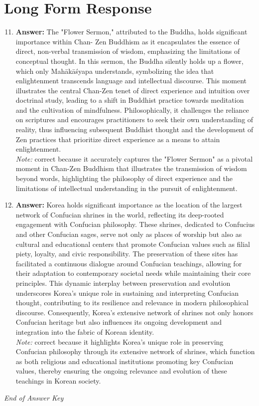\documentclass[12pt]{article}
\begin{document}
\section*{Long Form Response}
\begin{enumerate}[label=\arabic*.]
\setcounter{enumi}{10}
\item \textbf{Answer:} The "Flower Sermon," attributed to the Buddha, holds significant importance within Chan- Zen Buddhism as it encapsulates the essence of direct, non-verbal transmission of wisdom, emphasizing the limitations of conceptual thought. In this sermon, the Buddha silently holds up a flower, which only Mahākāśyapa understands, symbolizing the idea that enlightenment transcends language and intellectual discourse. This moment illustrates the central Chan-Zen tenet of direct experience and intuition over doctrinal study, leading to a shift in Buddhist practice towards meditation and the cultivation of mindfulness. Philosophically, it challenges the reliance on scriptures and encourages practitioners to seek their own understanding of reality, thus influencing subsequent Buddhist thought and the development of Zen practices that prioritize direct experience as a means to attain enlightenment.
\\ \textit{Note:} correct because it accurately captures the "Flower Sermon" as a pivotal moment in Chan-Zen Buddhism that illustrates the transmission of wisdom beyond words, highlighting the philosophy of direct experience and the limitations of intellectual understanding in the pursuit of enlightenment.
\item \textbf{Answer:} Korea holds significant importance as the location of the largest network of Confucian shrines in the world, reflecting its deep-rooted engagement with Confucian philosophy. These shrines, dedicated to Confucius and other Confucian sages, serve not only as places of worship but also as cultural and educational centers that promote Confucian values such as filial piety, loyalty, and civic responsibility. The preservation of these sites has facilitated a continuous dialogue around Confucian teachings, allowing for their adaptation to contemporary societal needs while maintaining their core principles. This dynamic interplay between preservation and evolution underscores Korea's unique role in sustaining and interpreting Confucian thought, contributing to its resilience and relevance in modern philosophical discourse. Consequently, Korea's extensive network of shrines not only honors Confucian heritage but also influences its ongoing development and integration into the fabric of Korean identity.
\\ \textit{Note:} correct because it highlights Korea's unique role in preserving Confucian philosophy through its extensive network of shrines, which function as both religious and educational institutions promoting key Confucian values, thereby ensuring the ongoing relevance and evolution of these teachings in Korean society.
\end{enumerate}

\vfill
\noindent\textit{End of Answer Key}
\end{document}
